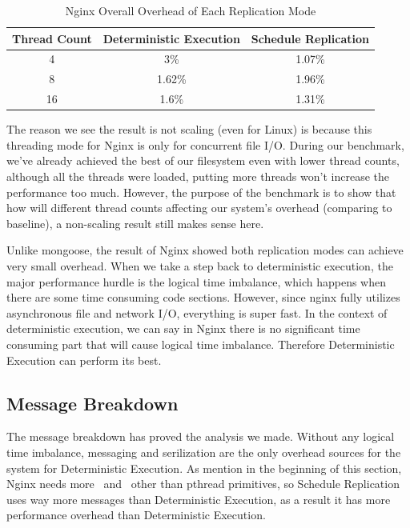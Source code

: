 \begin{table}
\caption{Nginx Overall Overhead of Each Replication Mode}
\begin{center}
 \begin{tabular}{c | c | c}
Thread Count & Deterministic Execution & Schedule Replication \\ \hline
 4 & 3\% & 1.07\% \\ \hline
 8 & 1.62\% & 1.96\% \\ \hline
 16 & 1.6\% & 1.31\% \\ \hline
 \end{tabular}
\end{center}
\label{t:nginx_overall}
\end{table}

The reason we see the result is not scaling (even for Linux) is because this threading mode for Nginx is only for concurrent file I/O. During our benchmark, we've already achieved the best of our filesystem even with lower thread counts, although all the threads were loaded, putting more threads won't increase the performance too much. However, the purpose of the benchmark is to show that how will different thread counts affecting our system's overhead (comparing to baseline), a non-scaling result still makes sense here.

Unlike mongoose, the result of Nginx showed both replication modes can achieve very small overhead. When we take a step back to deterministic execution, the major performance hurdle is the logical time imbalance, which happens when there are some time consuming code sections. However, since nginx fully utilizes asynchronous file and network I/O, everything is super fast. In the context of deterministic execution, we can say in Nginx there is no significant time consuming part that will cause logical time imbalance. Therefore Deterministic Execution can perform its best.


\subsection{Message Breakdown}

The message breakdown has proved the analysis we made. Without any logical time imbalance, messaging and serilization are the only overhead sources for the system for Deterministic Execution. As mention in the beginning of this section, Nginx needs more \detstart\ and \detend\ other than pthread primitives, so Schedule Replication uses way more messages than Deterministic Execution, as a result it has more performance overhead than Deterministic Execution.

